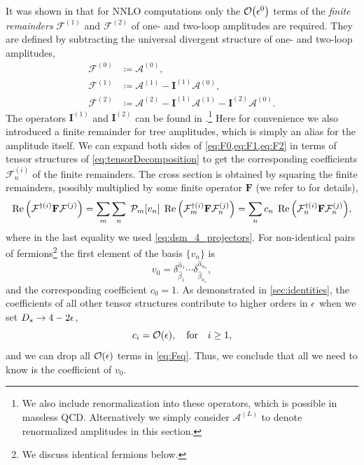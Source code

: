 It was shown in \cite{Weinzierl:2011uz} that for NNLO computations only the $\order{\eps^0}$ terms of the 
\emph{finite remainders} $\mathcal{F}^{(1)}$ and $\mathcal{F}^{(2)}$ of one- and two-loop amplitudes are required.
They are defined by subtracting the universal divergent structure of one- and two-loop amplitudes, 
\begin{subequations}
  \begin{align}
    \label{eq:F0}
    \mathcal{F}^{(0)} &\coloneqq \mathcal{A}^{(0)}, \\ 
     \label{eq:F1}
    \mathcal{F}^{(1)} &\coloneqq \mathcal{A}^{(1)} - \mathbf{I}^{(1)} \mathcal{A}^{(0)}, \\ 
     \label{eq:F2}
    \mathcal{F}^{(2)} &\coloneqq \mathcal{A}^{(2)}  - \mathbf{I}^{(1)} \mathcal{A}^{(1)} - \mathbf{I}^{(2)} \mathcal{A}^{(0)}.
  \end{align}
\end{subequations}
The operators $\mathbf{I}^{(1)}$ and $\mathbf{I}^{(2)}$ can be found in \cite{Catani:1998bh,Sterman:2002qn,Becher:2009cu,Gardi:2009qi}.\footnote{
  We also include renormalization into these operators, which is possible in massless QCD.
  Alternatively we simply consider $\mathcal{A}^{(L)}$ to denote renormalized amplitudes in this section.
}
Here for convenience we also introduced a finite remainder for tree amplitudes, which is simply an alias for the amplitude itself.
We can expand both sides of \cref{eq:F0,eq:F1,eq:F2} in terms of tensor structures of \cref{eq:tensorDecomposition}
to get the corresponding coefficients $\mathcal{F}^{(i)}_n$ of the finite remainders.
The cross section is obtained by squaring the finite remainders, possibly multiplied by some
finite operator $\mathbf{F}$ (we refer to \cite{Weinzierl:2011uz} for details),
\begin{equation} \label{eq:Fsq}
  \Re\qty(\mathcal{F}^{\dagger(i)}\mathbf{F}\mathcal{F}^{(j)}) = \sum_m\sum_n\; \mathcal{P}_m \qty[v_n]  \; \Re\qty(\mathcal{F}^{\dagger(i)}_m\mathbf{F}\mathcal{F}^{(j)}_n) = 
     \sum_n c_n \; \Re\qty(\mathcal{F}^{\dagger(i)}_n\mathbf{F}\mathcal{F}^{(j)}_n),
\end{equation}
where in the last equality we used \cref{eq:dsm_4_projectors}.
For non-identical pairs of fermions\footnote{We discuss identical fermions below.} 
the first element of the basis $\{v_n\}$ is
\begin{equation}
  v_0  = \delta^{\hat{\alpha}_1}_{\hat{\beta}_1}\cdots \delta^{\hat{\alpha}_{n_s}}_{\hat{\beta}_{n_s}},
\end{equation}
and the corresponding coefficient $c_0 = 1$.
As demonstrated in \cref{sec:identities}, the coefficients of all other tensor structures
contribute to higher orders in $\epsilon$ when we set $D_s\to 4-2\epsilon$,
\begin{equation}
  c_i=\order{\eps}, \qfor i\geq 1,
\end{equation}
and we can drop all $\order{\eps}$ terms in \cref{eq:Fsq}.
Thus, we conclude that all we need to know is the coefficient of $v_0$.


